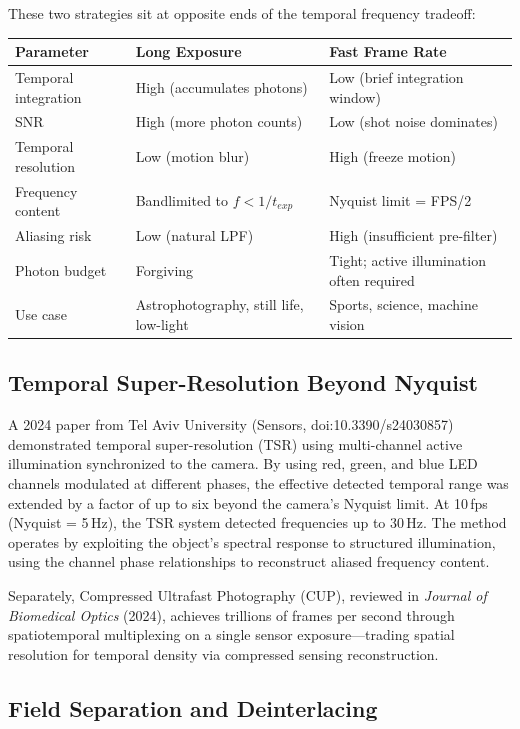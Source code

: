 \documentclass[11pt,letterpaper]{article}
\newcommand{\thead}[1]{\cellcolor{TableHead}\textbf{\sffamily\color{white}\small #1}}
\newcommand{\altrow}{\rowcolor{TableAlt}}
\begin{document}
These two strategies sit at opposite ends of the temporal frequency tradeoff:

\begin{longtable}{p{3.5cm}p{4.5cm}p{4.5cm}}
\toprule
\thead{Parameter} & \thead{Long Exposure} & \thead{Fast Frame Rate} \\
\midrule
\endhead
Temporal integration & High (accumulates photons) & Low (brief integration window) \\
\altrow SNR & High (more photon counts) & Low (shot noise dominates) \\
Temporal resolution & Low (motion blur) & High (freeze motion) \\
\altrow Frequency content & Bandlimited to $f < 1/t_{exp}$ & Nyquist limit = FPS/2 \\
Aliasing risk & Low (natural LPF) & High (insufficient pre-filter) \\
\altrow Photon budget & Forgiving & Tight; active illumination often required \\
Use case & Astrophotography, still life, low-light & Sports, science, machine vision \\
\bottomrule
\end{longtable}

\subsection{Temporal Super-Resolution Beyond Nyquist}

A 2024 paper from Tel Aviv University (Sensors, doi:10.3390/s24030857) demonstrated temporal super-resolution (TSR) using multi-channel active illumination synchronized to the camera. By using red, green, and blue LED channels modulated at different phases, the effective detected temporal range was extended by a factor of up to six beyond the camera's Nyquist limit. At 10\,fps (Nyquist = 5\,Hz), the TSR system detected frequencies up to 30\,Hz. The method operates by exploiting the object's spectral response to structured illumination, using the channel phase relationships to reconstruct aliased frequency content.

Separately, Compressed Ultrafast Photography (CUP), reviewed in \emph{Journal of Biomedical Optics} (2024), achieves trillions of frames per second through spatiotemporal multiplexing on a single sensor exposure---trading spatial resolution for temporal density via compressed sensing reconstruction.

\subsection{Field Separation and Deinterlacing}
\end{document}
